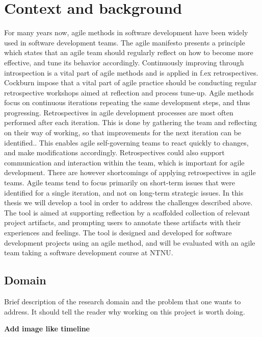 \section{Context and background}
For many years now, agile methods in software development have been widely used in software development teams. The agile manifesto presents a principle which states that an agile team should regularly reflect on how to become more effective, and tune its behavior accordingly\cite{Beck2001}. Continuously improving through introspection is a vital part of agile methods and is applied in f.ex retrospectives\cite{Beck1999, Derby2006, Maham2008}. Cockburn impose that a vital part of agile practice should be conducting regular retrospective workshops aimed at reflection and process tune-up\cite{Cockburn2006}. Agile methods focus on continuous iterations repeating the same development steps, and thus progressing. Retrospectives in agile development processes are most often performed after each iteration. This is done by gathering the team and reflecting on their way of working, so that improvements for the next iteration can be identified.\cite{Derby2006, Drury2011}. This enables agile self-governing teams to react quickly to changes, and make modifications accordingly\cite{Drury2011}. Retrospectives could also support communication and interaction within the team, which is important for agile development. There are however shortcomings of applying retrospectives in agile teams. Agile teams tend to focus primarily on short-term issues that were identified for a single iteration, and not on long-term strategic issues\cite{Drury2011}. 
In this thesis we will develop a tool in order to address the challenges described above. The tool is aimed at supporting reflection by a scaffolded collection of relevant project artifacts, and prompting users to annotate these artifacts with their experiences and feelings. The tool is designed and developed for software development projects using an agile method, and will be evaluated with an agile team taking a software development course at NTNU. 

\subsection{Domain}
Brief description of the research domain and the problem that one
wants to address. It should tell the reader why working on this project is worth
doing.

\textbf{Add image like timeline}



